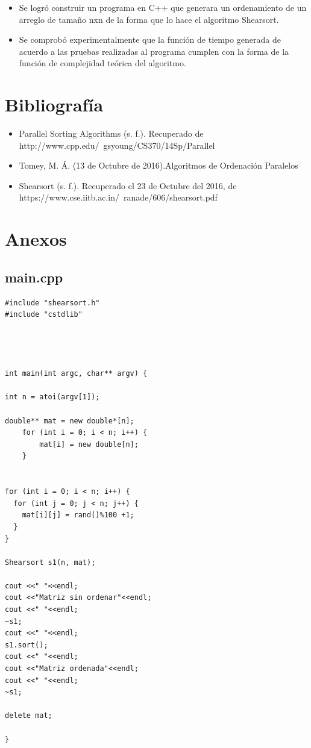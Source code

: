\documentclass[11pt]{article}
\begin{document}
\begin{itemize}
\item Se logró construir un programa en C++ que generara un ordenamiento de un arreglo de tamaño nxn de la forma que lo hace el algoritmo Shearsort.
\item Se comprobó experimentalmente que la función de tiempo generada de acuerdo a las pruebas realizadas al programa cumplen con la forma de la función de complejidad teórica del algoritmo.

\end{itemize}

\section{Bibliografía}

\begin{itemize}




\item Parallel Sorting Algorithms (s. f.). Recuperado de http://www.cpp.edu/~gsyoung/CS370/14Sp/Parallel%

\item Tomey, M. Á. (13 de Octubre de 2016).Algoritmos de Ordenación Paralelos

\item Shearsort (s. f.). Recuperado el 23 de Octubre del 2016, de https://www.cse.iitb.ac.in/~ranade/606/shearsort.pdf

\end{itemize}

\section{Anexos}

\subsection{main.cpp}

\begin{lstlisting}
#include "shearsort.h"
#include "cstdlib"




int main(int argc, char** argv) {

int n = atoi(argv[1]);

double** mat = new double*[n];
	for (int i = 0; i < n; i++) {
		mat[i] = new double[n];
	}


for (int i = 0; i < n; i++) {
  for (int j = 0; j < n; j++) {
    mat[i][j] = rand()%100 +1;
  }
}

Shearsort s1(n, mat);

cout <<" "<<endl;
cout <<"Matriz sin ordenar"<<endl;
cout <<" "<<endl;
~s1;
cout <<" "<<endl;
s1.sort();
cout <<" "<<endl;
cout <<"Matriz ordenada"<<endl;
cout <<" "<<endl;
~s1;

delete mat;

}
\end{lstlisting}
\end{document}
